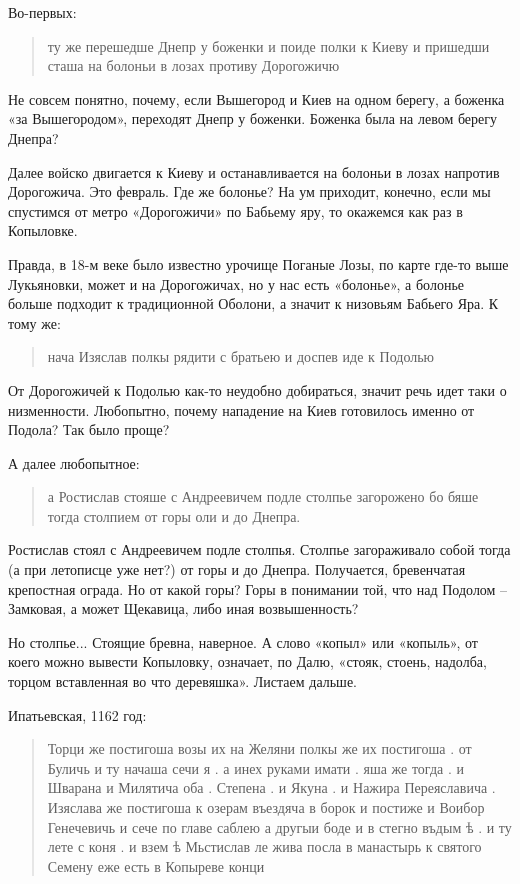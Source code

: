Во-первых:

\begin{quotation}
ту же перешедше Днепр у боженки и поиде полки к Киеву и пришедши сташа на болоньи  в лозах противу Дорогожичю
\end{quotation}
  
Не совсем понятно, почему, если Вышегород и Киев на одном берегу, а боженка «за Вышегородом», переходят Днепр у боженки. Боженка была на левом берегу Днепра? 

Далее войско двигается к Киеву и останавливается на болоньи в лозах напротив Дорогожича. Это февраль. Где же болонье? На ум приходит, конечно, если мы спустимся от метро «Дорогожичи» по Бабьему яру, то окажемся как раз в Копыловке. 

Правда, в 18-м веке было известно урочище Поганые Лозы, по карте где-то выше Лукьяновки, может и на Дорогожичах, но у нас есть «болонье», а болонье больше подходит к традиционной Оболони, а значит к низовьям Бабьего Яра. К тому же:

\begin{quotation}
нача Изяслав полкы рядити с братьею и доспев иде к Подолью
\end{quotation}

От Дорогожичей к Подолью как-то неудобно добираться, значит речь идет таки о низменности. Любопытно, почему нападение на Киев готовилось именно от Подола? Так было проще? 

А далее любопытное:

\begin{quotation}
а Ростислав стояше с Андреевичем
подле столпье загорожено бо бяше тогда  столпием от горы оли и до Днепра.\end{quotation}

Ростислав стоял с Андреевичем подле столпья. Столпье загораживало собой тогда (а при летописце уже нет?) от горы и до Днепра. Получается, бревенчатая крепостная ограда. Но от какой горы? Горы в понимании той, что над Подолом – Замковая, а может Щекавица, либо иная возвышенность?

Но столпье... Стоящие бревна, наверное. А слово «копыл» или «копыль», от коего можно вывести Копыловку, означает, по Далю, «стояк,  стоень,  надолба, торцом  вставленная во что деревяшка». Листаем дальше.

Ипатьевская, 1162 год:

\begin{quotation}
Торци же постигоша возы их на Желяни полкы же их постигоша . от Буличь и ту начаша сечи я . а инех руками имати . яша же тогда . и Шварана  и Милятича оба . Степена . и Якуна . и Нажира Переяславича . Изяслава же постигоша к озерам въездяча в борок и постиже и Воибор Генечевичь и сече по главе саблею а другыи  боде и в стегно въдым ѣ . и ту
лете с коня . и взем ѣ Мьстислав ле жива посла в манастырь к святого Семену еже есть  в Копыреве конци
\end{quotation}

